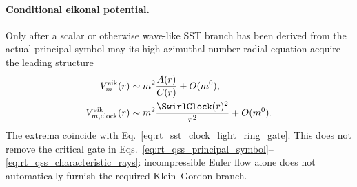         \paragraph{Conditional eikonal potential.}
        Only after a scalar or otherwise wave-like SST branch has been derived from the
        actual principal symbol may its high-azimuthal-number radial equation acquire
        the leading structure
        \begin{align}
            V_m^{\mathrm{eik}}(r)
            &\sim
            m^2\frac{A(r)}{C(r)}+O(m^0),
            \\
            V_{m,\mathrm{clock}}^{\mathrm{eik}}(r)
            &\sim
            m^2\frac{\SwirlClock(r)^2}{r^2}+O(m^0).
            \label{eq:rt_sst_fermat_eikonal_potential}
        \end{align}
        The extrema coincide with
        Eq.~\eqref{eq:rt_sst_clock_light_ring_gate}.  This does not remove the
        critical gate in Eqs.~\eqref{eq:rt_qss_principal_symbol}--\eqref{eq:rt_qss_characteristic_rays}:
        incompressible Euler flow alone does not automatically furnish the required
        Klein--Gordon branch.

